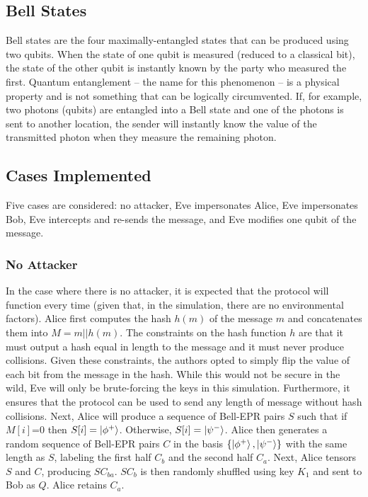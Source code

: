 \documentclass[conference]{IEEEtran}
\begin{document}
\subsection{Bell States}

Bell states are the four maximally-entangled states that can be produced
using two qubits. When the state of one qubit is measured (reduced
to a classical bit), the state of the other qubit is instantly known
by the party who measured the first. Quantum entanglement -- the name
for this phenomenon -- is a physical property and is not something
that can be logically circumvented. If, for example, two photons (qubits)
are entangled into a Bell state and one of the photons is sent to
another location, the sender will instantly know the value of the
transmitted photon when they measure the remaining photon. 

\subsection{Cases Implemented}

Five cases are considered: no attacker, Eve impersonates Alice, Eve
impersonates Bob, Eve intercepts and re-sends the message, and Eve
modifies one qubit of the message.

\subsubsection{No Attacker}

In the case where there is no attacker, it is expected that the protocol
will function every time (given that, in the simulation, there are
no environmental factors). Alice first computes the hash $h(m)$ of
the message $m$ and concatenates them into $M=m||h(m)$. The constraints
on the hash function $h$ are that it must output a hash equal in
length to the message and it must never produce collisions. Given
these constraints, the authors opted to simply flip the value of each
bit from the message in the hash. While this would not be secure in
the wild, Eve will only be brute-forcing the keys in this simulation.
Furthermore, it ensures that the protocol can be used to send any
length of message without hash collisions. Next, Alice will produce
a sequence of Bell-EPR pairs $S$ such that if $M[i]$=0 then $S[i]=\ket{\phi^{+}} $.
Otherwise, $S[i]=\ket{\psi^{-}} $. Alice then generates
a random sequence of Bell-EPR pairs $C$ in the basis $\left\{ \ket{\phi^{+}} ,\ket{\psi^{-}} \right\} $
with the same length as $S$, labeling the first half $C_{b}$ and
the second half $C_{a}$. Next, Alice tensors $S$ and $C$, producing
$SC_{ba}$. $SC_{b}$ is then randomly shuffled using key $K_{1}$
and sent to Bob as $Q$. Alice retains $C_{a}$.
\end{document}
